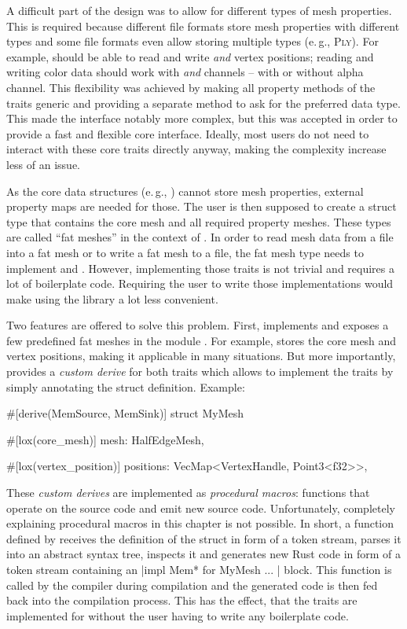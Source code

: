 A difficult part of the design was to allow for different types of mesh properties.
This is required because different file formats store mesh properties with different types and some file formats even allow storing multiple types (e.\,g., \textsc{Ply}).
For example,  should be able to read and write  \emph{and}  vertex positions;
reading and writing color data should work with  \emph{and}  channels -- with or without alpha channel.
This flexibility was achieved by making all property methods of the  traits generic and providing a separate method to ask for the preferred data type.
This made the interface notably more complex, but this was accepted in order to provide a fast and flexible core interface.
Ideally, most users do not need to interact with these core traits directly anyway, making the complexity increase less of an issue.

As the core data structures (e.\,g., ) cannot store mesh properties, external property maps are needed for those.
The user is then supposed to create a struct type that contains the core mesh and all required property meshes.
These types are called \enquote{fat meshes} in the context of .
In order to read mesh data from a file into a fat mesh or to write a fat mesh to a file, the fat mesh type needs to implement  and .
However, implementing those traits is not trivial and requires a lot of boilerplate code.
Requiring the user to write those implementations would make using the library a lot less convenient.

Two features are offered to solve this problem.
First,  implements and exposes a few predefined fat meshes in the module .
For example,  stores the core mesh and  vertex positions, making it applicable in many situations.
But more importantly,  provides a \emph{custom derive} for both  traits which allows to implement the traits by simply annotating the struct definition.
Example:

\begin{rustcode}
#[derive(MemSource, MemSink)]
struct MyMesh {
    #[lox(core_mesh)]
    mesh: HalfEdgeMesh,

    #[lox(vertex_position)]
    positions: VecMap<VertexHandle, Point3<f32>>,
}
\end{rustcode}

These \emph{custom derives} are implemented as \emph{procedural macros}: functions that operate on the source code and emit new source code.
Unfortunately, completely explaining procedural macros in this chapter is not possible.
In short, a function defined by  receives the definition of the struct  in form of a token stream, parses it into an abstract syntax tree, inspects it and generates new Rust code in form of a token stream containing an \code|impl Mem* for MyMesh { ... }| block.
This function is called by the compiler during compilation and the generated code is then fed back into the compilation process.
This has the effect, that the  traits are implemented for  without the user having to write any boilerplate code.

